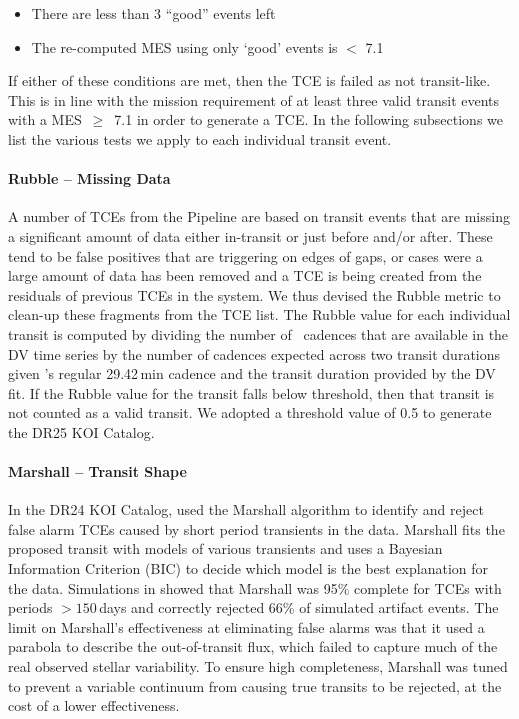 \begin{itemize}
\item There are less than 3 ``good'' events left
\item The re-computed MES using only `good' events is $<$ 7.1
\end{itemize}

\noindent If either of these conditions are met, then the TCE is failed as not transit-like. This is in line with the \kepler{} mission requirement of at least three valid transit events with a MES~$\ge$~7.1 in order to generate a TCE. In the following subsections we list the various tests we apply to each individual transit event.


\paragraph{Rubble -- Missing Data}
\label{s:rubble}
A number of TCEs from the \kepler{} Pipeline are based on transit events that are missing a significant amount of data either in-transit or just before and/or after. These tend to be false positives that are triggering on edges of gaps, or cases were a large amount of data has been removed and a TCE is being created from the residuals of previous TCEs in the system. We thus devised the Rubble metric to clean-up these fragments from the TCE list. The Rubble value for each individual transit is computed by dividing the number of \Kepler\ cadences that are available in the DV time series by the number of cadences expected across two transit durations given \Kepler's regular 29.42\,min cadence and the transit duration provided by the DV fit. If the Rubble value for the transit falls below threshold, then that transit is not counted as a valid transit. We adopted a threshold value of 0.5 to generate the DR25 KOI Catalog.


\paragraph{Marshall -- Transit Shape}
\label{s:marshall}
In the DR24 KOI Catalog, \citet{Coughlin2016} used the Marshall algorithm \citep{Mullally2016} to identify and reject false alarm TCEs caused by short period transients in the data. Marshall fits the proposed transit with models of various transients and uses a Bayesian Information Criterion (BIC) to decide which model is the best explanation for the data. Simulations in \citet{Mullally2016} showed that Marshall was 95\% complete for TCEs with periods $>150$\,days and correctly rejected 66\% of simulated artifact events. The limit on Marshall's effectiveness at eliminating false alarms was that it used a parabola to describe the out-of-transit flux, which failed to capture much of the real observed stellar variability. To ensure high completeness, Marshall was tuned to prevent a variable continuum from causing true transits to be rejected, at the cost of a lower effectiveness.

